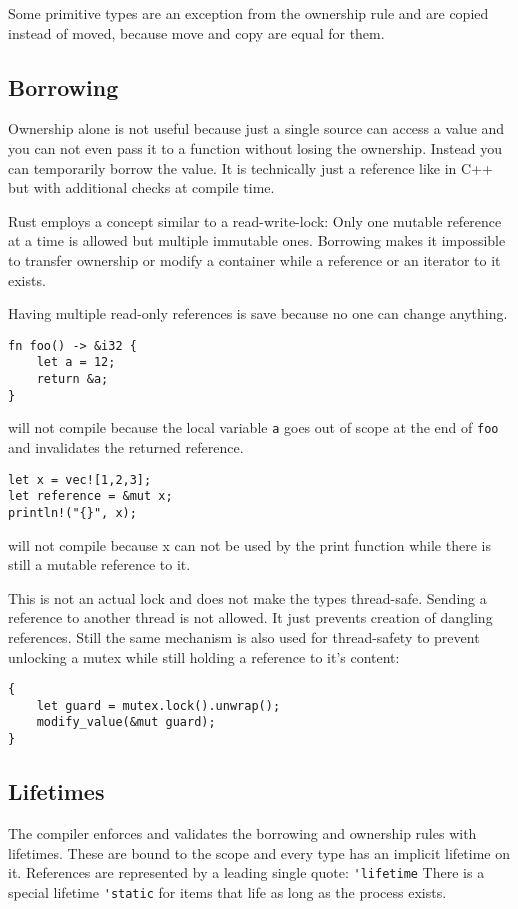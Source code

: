 \documentclass[conference,twocolumn]{IEEEtran}
\begin{document}
Some primitive types are an exception from the ownership rule and are copied instead of moved, because move and copy are equal for them.


\subsection{Borrowing}
Ownership alone is not useful because just a single source can access a value and you can not even pass it to a function without losing the ownership. \cite{RustBook}
Instead you can temporarily borrow the value. It is technically just a reference like in C++ but with additional checks at compile time.

Rust employs a concept similar to a read-write-lock: Only one mutable reference at a time is allowed but multiple immutable ones. Borrowing makes it impossible to transfer ownership or modify a container while a reference or an iterator to it exists.

Having multiple read-only references is save because no one can change anything.

\begin{lstlisting}[frame=single]
fn foo() -> &i32 {
    let a = 12;
    return &a;
}
\end{lstlisting}
will not compile because the local variable \verb|a| goes out of scope at the end of \verb|foo| and invalidates the returned reference.


\begin{lstlisting}[frame=single]
let x = vec![1,2,3];
let reference = &mut x;
println!("{}", x);
\end{lstlisting}
will not compile because x can not be used by the print function while there is still a mutable reference to it.

This is not an actual lock and does not make the types thread-safe. Sending a reference to another thread is not allowed. It just prevents creation of dangling references. Still the same mechanism is also used for thread-safety to prevent unlocking a mutex while still holding a reference to it's content:

\begin{lstlisting}[frame=single]
{
    let guard = mutex.lock().unwrap();
    modify_value(&mut guard);
}
\end{lstlisting}


\subsection{Lifetimes}
The compiler enforces and validates the borrowing and ownership rules with lifetimes. These are bound to the scope and every type has an implicit lifetime on it. \cite{RustBook}
References are represented by a leading single quote: \verb|'lifetime|
There is a special lifetime \verb|'static| for items that life as long as the process exists.
\end{document}
